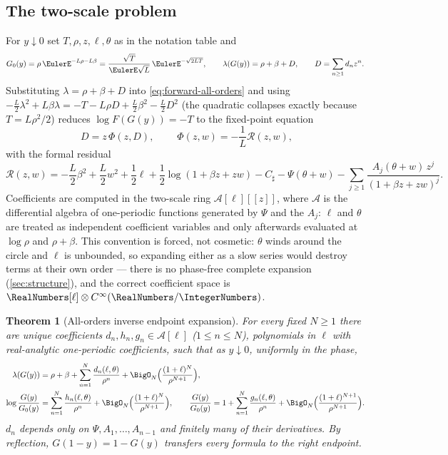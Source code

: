 \documentclass[11pt,oneside]{article}
\numberwithin{equation}{section}
\newtheorem{theorem}{Theorem}[section]
\theoremstyle{definition}
\theoremstyle{remark}
\newcommand{\Csharp}{C_{\sharp}}
\newcommand{\Gzero}{G_0}
\begin{document}
\subsection{The two-scale problem}

For $y\downarrow0$ set
$T,\rho,z,\ell,\theta$ as in the notation table and
\begin{equation}
 \Gzero(y)=\rho\,\EulerE^{-L\rho-L\beta}
 =\frac{\sqrt T}{\EulerE\sqrt L}\,\EulerE^{-\sqrt{2LT}},
 \qquad
 \lambda(G(y))=\rho+\beta+D,
 \qquad
 D=\sum_{n\ge1}d_nz^{n}.
 \label{eq:G0-D}
\end{equation}
Substituting $\lambda=\rho+\beta+D$ into
\eqref{eq:forward-all-orders} and using
$-\tfrac L2\lambda^{2}+L\beta\lambda
=-T-L\rho D+\tfrac L2\beta^{2}-\tfrac L2D^{2}$ (the quadratic
collapses exactly because $T=L\rho^{2}/2$) reduces
$\log F(G(y))=-T$ to the fixed-point equation
\begin{equation}
 \boxed{\;D=z\,\Phi(z,D),\;}
 \qquad
 \Phi(z,w)=-\frac1L\mathcal R(z,w),
 \label{eq:fixed-point}
\end{equation}
with the formal residual
\begin{equation}
 \mathcal R(z,w)=
 -\frac L2\beta^{2}+\frac L2w^{2}+\frac12\ell
 +\frac12\log(1+\beta z+zw)
 -\Csharp-\Psi(\theta+w)
 -\sum_{j\ge1}\frac{A_j(\theta+w)\,z^{j}}{(1+\beta z+zw)^{j}}.
 \label{eq:R-def}
\end{equation}
Coefficients are computed in the two-scale ring
$\mathscr A[\ell][[z]]$, where $\mathscr A$ is the differential
algebra of one-periodic functions generated by $\Psi$ and the $A_j$:
$\ell$ and $\theta$ are treated as independent coefficient variables
and only afterwards evaluated at $\log\rho$ and $\rho+\beta$.  This
convention is forced, not cosmetic: $\theta$ winds around the circle
and $\ell$ is unbounded, so expanding either as a slow series would
destroy terms at their own order --- there is no phase-free complete
expansion (\cref{sec:structure}), and the correct coefficient space
is $\RealNumbers[\ell]\otimes C^\infty(\RealNumbers/\IntegerNumbers)$.

\begin{theorem}[All-orders inverse endpoint expansion]
\label{thm:all-orders}
For every fixed $N\ge1$ there are unique coefficients
$d_n,h_n,g_n\in\mathscr A[\ell]$ ($1\le n\le N$), polynomials in
$\ell$ with real-analytic one-periodic coefficients, such that as
$y\downarrow0$, uniformly in the phase,
\begin{align}
 \lambda(G(y))
 &=\rho+\beta+\sum_{n=1}^{N}\frac{d_n(\ell,\theta)}{\rho^{n}}
 +\BigO_N\Bigl(\frac{(1+\ell)^{N}}{\rho^{N+1}}\Bigr),
 \label{eq:phase-expansion}\\
 \log\frac{G(y)}{\Gzero(y)}
 &=\sum_{n=1}^{N}\frac{h_n(\ell,\theta)}{\rho^{n}}
 +\BigO_N\Bigl(\frac{(1+\ell)^{N}}{\rho^{N+1}}\Bigr),
 \qquad
 \frac{G(y)}{\Gzero(y)}
 =1+\sum_{n=1}^{N}\frac{g_n(\ell,\theta)}{\rho^{n}}
 +\BigO_N\Bigl(\frac{(1+\ell)^{N+1}}{\rho^{N+1}}\Bigr).
 \label{eq:G-expansion}
\end{align}
$d_n$ depends only on $\Psi,A_1,\dots,A_{n-1}$ and finitely many of
their derivatives.  By reflection, $G(1-y)=1-G(y)$ transfers every
formula to the right endpoint.
\end{theorem}
\end{document}
